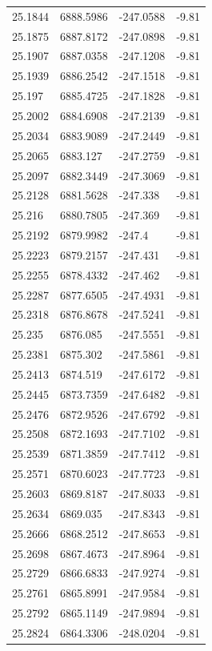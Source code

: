 \begin{table}[H]
\begin{tabular}{llll}
25.1844 & 6888.5986 & -247.0588 & -9.81 \\
25.1875 & 6887.8172 & -247.0898 & -9.81 \\
25.1907 & 6887.0358 & -247.1208 & -9.81 \\
25.1939 & 6886.2542 & -247.1518 & -9.81 \\
25.197 & 6885.4725 & -247.1828 & -9.81 \\
25.2002 & 6884.6908 & -247.2139 & -9.81 \\
25.2034 & 6883.9089 & -247.2449 & -9.81 \\
25.2065 & 6883.127 & -247.2759 & -9.81 \\
25.2097 & 6882.3449 & -247.3069 & -9.81 \\
25.2128 & 6881.5628 & -247.338 & -9.81 \\
25.216 & 6880.7805 & -247.369 & -9.81 \\
25.2192 & 6879.9982 & -247.4 & -9.81 \\
25.2223 & 6879.2157 & -247.431 & -9.81 \\
25.2255 & 6878.4332 & -247.462 & -9.81 \\
25.2287 & 6877.6505 & -247.4931 & -9.81 \\
25.2318 & 6876.8678 & -247.5241 & -9.81 \\
25.235 & 6876.085 & -247.5551 & -9.81 \\
25.2381 & 6875.302 & -247.5861 & -9.81 \\
25.2413 & 6874.519 & -247.6172 & -9.81 \\
25.2445 & 6873.7359 & -247.6482 & -9.81 \\
25.2476 & 6872.9526 & -247.6792 & -9.81 \\
25.2508 & 6872.1693 & -247.7102 & -9.81 \\
25.2539 & 6871.3859 & -247.7412 & -9.81 \\
25.2571 & 6870.6023 & -247.7723 & -9.81 \\
25.2603 & 6869.8187 & -247.8033 & -9.81 \\
25.2634 & 6869.035 & -247.8343 & -9.81 \\
25.2666 & 6868.2512 & -247.8653 & -9.81 \\
25.2698 & 6867.4673 & -247.8964 & -9.81 \\
25.2729 & 6866.6833 & -247.9274 & -9.81 \\
25.2761 & 6865.8991 & -247.9584 & -9.81 \\
25.2792 & 6865.1149 & -247.9894 & -9.81 \\
25.2824 & 6864.3306 & -248.0204 & -9.81 \\

\end{tabular}
\end{table}
